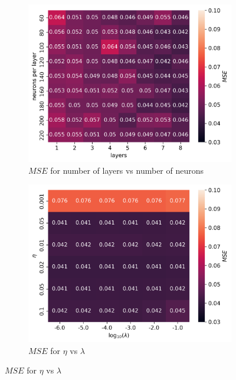 \documentclass[11pt]{article}
\begin{document}
\begin{figure}[H]
    \begin{subfigure}{.5\textwidth}
        \centering
        \includegraphics[width=\textwidth]{../figures/franke_L_n_test_lrelu_MSE.png}
        \caption{$MSE$ for number of layers vs number of neurons}
        \label{fig:}
    \end{subfigure}
    \begin{subfigure}{.5\textwidth}
        \centering
        \includegraphics[width=\textwidth]{../figures/franke_eta_lmb_lrelu_MSE.png}
        \caption{$MSE$ for $\eta$ vs $\lambda$}
        \label{fig:}
    \end{subfigure}

\end{figure}
\end{document}
